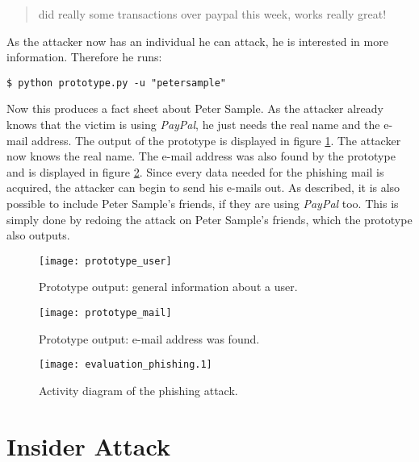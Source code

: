 \begin{quote}
did really some transactions over paypal this week, works really great!
\end{quote}

As the attacker now has an individual he can attack, he is interested in more
information. Therefore he runs:

\lstset{language=bash}
\begin{lstlisting}
$ python prototype.py -u "petersample"
\end{lstlisting}

Now this produces a fact sheet about Peter Sample. As the attacker already
knows that the victim is using \textit{PayPal}, he just needs the real name
and the e-mail address. The output of the prototype is displayed in figure
\ref{fig:prototype_user}. The attacker now knows the real name. The e-mail
address was also found by the prototype and is displayed in figure
\ref{fig:prototype_mail}. Since every data needed for the phishing mail is
acquired, the attacker can begin to send his e-mails out. As described,
it is also possible to include Peter Sample's friends, if they are using
\textit{PayPal} too. This is simply done by redoing the attack on Peter
Sample's friends, which the prototype also outputs.

\begin{figure}[htb]
  \begin{center}
    \texttt{[image: prototype\_user]}
    \caption{Prototype output: general information about a user.}
    \label{fig:prototype_user}
  \end{center}
\end{figure}

\begin{figure}[htb]
  \begin{center}
    \texttt{[image: prototype\_mail]}
    \caption{Prototype output: e-mail address was found.}
    \label{fig:prototype_mail}
  \end{center}
\end{figure}

\begin{figure}[ht]
  \begin{center}
    \texttt{[image: evaluation\_phishing.1]}
    \caption{Activity diagram of the phishing attack.}
    \label{fig:evaluation_phishing}
  \end{center}
\end{figure}

\section{Insider Attack}

